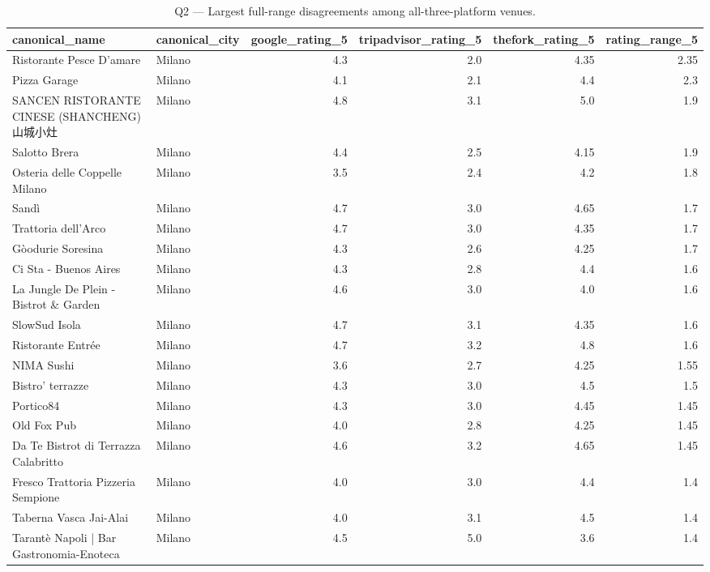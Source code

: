 \begin{table}[ht]
\centering
\caption{Q2 — Largest full-range disagreements among all-three-platform venues.}
\label{tab:q2_top_all_three}
{\tiny
\begin{tabular}{llrrrr}
\toprule
canonical\_name & canonical\_city & google\_rating\_5 & tripadvisor\_rating\_5 & thefork\_rating\_5 & rating\_range\_5 \\
\midrule
Ristorante Pesce D'amare & Milano & 4.3 & 2.0 & 4.35 & 2.35 \\
Pizza Garage & Milano & 4.1 & 2.1 & 4.4 & 2.3 \\
SANCEN RISTORANTE CINESE (SHANCHENG) 山城小灶 & Milano & 4.8 & 3.1 & 5.0 & 1.9 \\
Salotto Brera & Milano & 4.4 & 2.5 & 4.15 & 1.9 \\
Osteria delle Coppelle Milano & Milano & 3.5 & 2.4 & 4.2 & 1.8 \\
Sandì & Milano & 4.7 & 3.0 & 4.65 & 1.7 \\
Trattoria dell'Arco & Milano & 4.7 & 3.0 & 4.35 & 1.7 \\
Gòodurie Soresina & Milano & 4.3 & 2.6 & 4.25 & 1.7 \\
Ci Sta - Buenos Aires & Milano & 4.3 & 2.8 & 4.4 & 1.6 \\
La Jungle De Plein - Bistrot \& Garden & Milano & 4.6 & 3.0 & 4.0 & 1.6 \\
SlowSud Isola & Milano & 4.7 & 3.1 & 4.35 & 1.6 \\
Ristorante Entrée & Milano & 4.7 & 3.2 & 4.8 & 1.6 \\
NIMA Sushi & Milano & 3.6 & 2.7 & 4.25 & 1.55 \\
Bistro' terrazze & Milano & 4.3 & 3.0 & 4.5 & 1.5 \\
Portico84 & Milano & 4.3 & 3.0 & 4.45 & 1.45 \\
Old Fox Pub & Milano & 4.0 & 2.8 & 4.25 & 1.45 \\
Da Te Bistrot di Terrazza Calabritto & Milano & 4.6 & 3.2 & 4.65 & 1.45 \\
Fresco Trattoria Pizzeria Sempione & Milano & 4.0 & 3.0 & 4.4 & 1.4 \\
Taberna Vasca Jai-Alai & Milano & 4.0 & 3.1 & 4.5 & 1.4 \\
Tarantè Napoli | Bar Gastronomia-Enoteca & Milano & 4.5 & 5.0 & 3.6 & 1.4 \\
\bottomrule
\end{tabular}
}
\end{table}
